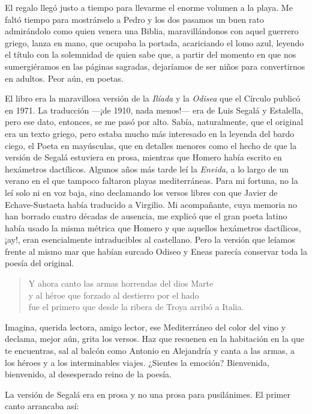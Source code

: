 \documentclass[11pt,a4paper]{article}
\begin{document}
El regalo llegó justo a tiempo para llevarme el enorme volumen a la playa. Me faltó tiempo para mostrárselo a Pedro y los dos pasamos un buen rato admirándolo como quien venera una Biblia, maravillándonos con aquel guerrero griego, lanza en mano, que ocupaba la portada, acariciando el lomo azul, leyendo el título con la solemnidad de quien sabe que, a partir del momento en que nos sumergiéramos en las páginas sagradas, dejaríamos de ser niños para convertirnos en adultos. Peor aún, en poetas.

El libro era la maravillosa versión de la \emph{Ilíada} y la \emph{Odisea} que el Círculo publicó en 1971. La traducción ---¡de 1910, nada menos!--- era de Luis Segalá y Estalella, pero ese dato, entonces, se me pasó por alto. Sabía, naturalmente, que el original era un texto griego, pero estaba mucho más interesado en la leyenda del bardo ciego, el Poeta en mayúsculas, que en detalles menores como el hecho de que la versión de Segalá estuviera en prosa, mientras que Homero había escrito en hexámetros dactílicos. Algunos años más tarde leí la \emph{Eneida}, a lo largo de un verano en el que tampoco faltaron playas mediterráneas. Para mi fortuna, no la leí solo ni en voz baja, sino declamando los versos libres con que Javier de Echave-Sustaeta había traducido a Virgilio. Mi acompañante, cuya memoria no han borrado cuatro décadas de ausencia, me explicó que el gran poeta latino había usado la misma métrica que Homero y que aquellos hexámetros dactílicos, ¡ay!, eran esencialmente intraducibles al castellano. Pero la versión que leíamos frente al mismo mar que habían surcado Odiseo y Eneas parecía conservar toda la poesía del original.

\begin{verse}
Y ahora canto las armas horrendas del dios Marte\\
y al héroe que forzado al destierro por el hado\\
fue el primero que desde la ribera de Troya arribó a Italia.
\end{verse}

Imagina, querida lectora, amigo lector, ese Mediterráneo del color del vino y declama, mejor aún, grita los versos. Haz que resuenen en la habitación en la que te encuentras, sal al balcón como Antonio en Alejandría y canta a las armas, a los héroes y a los interminables viajes. ¿Sientes la emoción? Bienvenida, bienvenido, al desesperado reino de la poesía.

La versión de Segalá era en prosa y no una prosa para pusilánimes. El primer canto arrancaba así:
\end{document}
